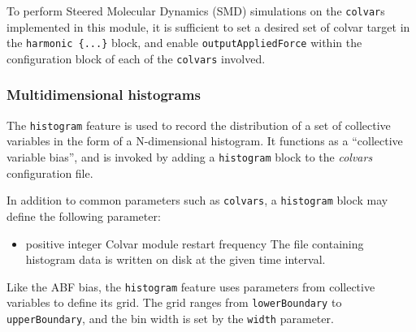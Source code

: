 To perform Steered Molecular Dynamics (SMD) simulations on the
\texttt{colvar}s implemented in this module, it is sufficient to set a
desired set of colvar target in the \texttt{harmonic~\{...\}} block,
and enable \texttt{outputAppliedForce} within the configuration block
of each of the \texttt{colvars} involved.


\subsubsection{Multidimensional histograms}
\label{sec:colvarbias_histogram}

The \texttt{histogram} feature is used to record the distribution of a set of collective
variables in the form of a N-dimensional histogram.
It functions as a ``collective variable bias'', and is invoked by adding a
\texttt{histogram} block to the \textit{colvars} configuration file.

In addition to common parameters such as \texttt{colvars}, a \texttt{histogram} block
may define the following parameter:

\begin{itemize}
\item {}
  {positive integer}
  {Colvar module restart frequency}
  {The file containing histogram data is written on disk at the given time interval.}
\end{itemize}

Like the ABF bias, the \texttt{histogram} feature uses parameters from
collective variables to define its grid. The grid ranges from
\texttt{lowerBoundary} to \texttt{upperBoundary}, and the bin width is
set by the \texttt{width} parameter.

